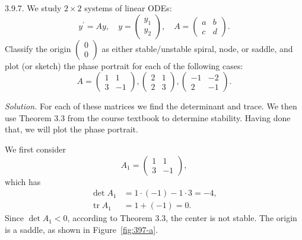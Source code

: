 \documentclass{article}
\DeclareMathOperator{\tr}{tr}
\begin{document}
3.9.7. We study $2 \times 2$ systems of linear ODEs:
%
\begin{equation*}
    y^\prime = A y, \quad
    y =
    \begin{pmatrix}
        y_1 \\
        y_2
    \end{pmatrix}, \quad
    A =
    \begin{pmatrix}
        a & b \\
        c & d
    \end{pmatrix}
    .
\end{equation*}
%
Classify the origin $\begin{pmatrix}0 \\ 0\end{pmatrix}$ as either
stable/unstable spiral, node, or saddle, and plot (or sketch) the
phase portrait for each of the following cases:
%
\begin{equation*}
    A =
    \begin{pmatrix}
        1 & 1 \\
        3 & -1
    \end{pmatrix}
    ,
    \begin{pmatrix}
        2 & 1 \\
        2 & 3
    \end{pmatrix}
    ,
    \begin{pmatrix}
        -1 & -2 \\
        2 & -1
    \end{pmatrix}
    .
\end{equation*}

\textit{Solution.}
For each of these matrices we find the determinant and trace. We then
use Theorem 3.3 from the course textbook to determine stability. Having
done that, we will plot the phase portrait.

We first consider
%
\begin{equation*}
    A_1 =
    \begin{pmatrix}
        1 & 1 \\
        3 & -1
    \end{pmatrix}
    ,
\end{equation*}
%
which has
%
\begin{align*}
    \det A_1 &= 1 \cdot (-1) - 1 \cdot 3 = -4, \\
    \tr A_1 &= 1 + (-1) = 0
    .
\end{align*}
%
Since $\det A_1 < 0$, according to Theorem 3.3, the center is not
stable. The origin is a saddle, as shown in Figure~\ref{fig:397-a}.
\end{document}

